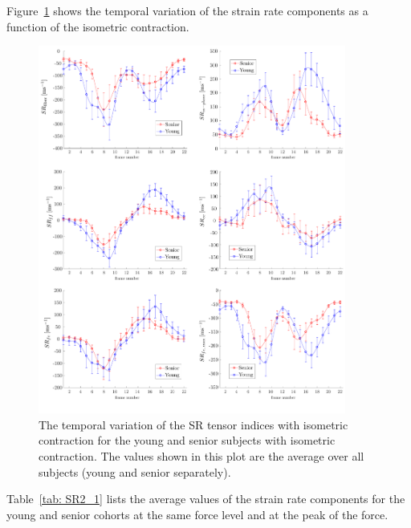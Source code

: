 Figure~\ref{fig: SR2_S2} shows the temporal variation of the strain rate components as a function of the isometric contraction.
\begin{figure}[htb!]
\vspace{+0.2cm}
\centering
\includegraphics[width=0.9\textwidth]{Figures/SRYO_SRtemporal.pdf}
\caption[The temporal variation of the SR tensor indices with isometric contraction for the young and senior subjects]{The temporal variation of the SR tensor indices with isometric contraction for the young and senior subjects with isometric contraction. The values shown in this plot are the average over all subjects (young and senior separately).}
\label{fig: SR2_S2}
\end{figure}
Table~\ref{tab: SR2_1} lists the average values of the strain rate components for the young and senior cohorts at the same force level and at the peak of the force.

